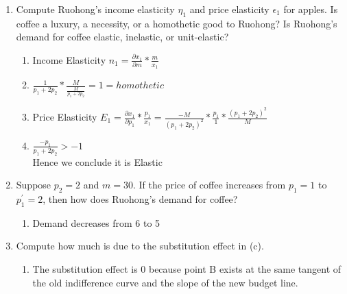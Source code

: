 \documentclass[11pt]{article}
\begin{document}
\begin{enumerate}
\begin{enumerate}
        \item Compute Ruohong's income elasticity $\eta_{1}$ and price elasticity $\epsilon_{1}$ for apples. Is coffee a luxury, a necessity, or a homothetic good to Ruohong? Is Ruohong's demand for coffee elastic, inelastic, or unit-elastic?
        \begin{enumerate}
            \item Income Elasticity $n_1 = \frac{\partial x_1}{\partial m}*\frac{m}{x_1}$
            \item $\frac{1}{p_1 + 2p_2}*\frac{M}{\frac{M}{p_1+2p_2}} = 1 = homothetic$
            \item Price Elasticity $E_1 = \frac{\partial x_1}{\partial p_1}*\frac{p_1}{x_1}=\frac{-M}{(p_1+2p_2)^2}*\frac{p_1}{1}*\frac{(p_1+2p_2)^2}{M}$
            \item $\frac{-p_1}{p_1+2p_2} > -1$\\
            Hence we conclude it is Elastic
        \end{enumerate}

        \item Suppose $p_{2}=2$ and $m=30$. If the price of coffee increases from $p_{1}=1$ to $p_{1}^{\prime}=2$, then how does Ruohong's demand for coffee?
        \begin{enumerate}
            \item Demand decreases from 6 to 5
        \end{enumerate}

        \item Compute how much is due to the substitution effect in (c).
        \begin{enumerate}
            \item The substitution effect is 0 because point B exists at the same tangent of the old indifference curve and the slope of the new budget line.
        \end{enumerate}

    \end{enumerate}



\end{enumerate}
\end{document}
